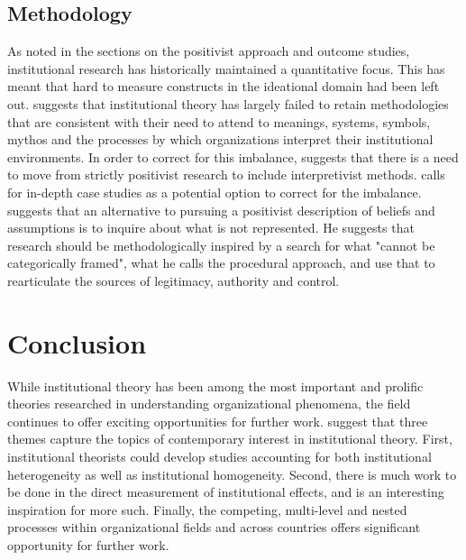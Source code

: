 \documentclass[12pt]{article}
\begin{document}
\subsection{Methodology}
As noted in the sections on the positivist approach and outcome studies, institutional research has historically maintained a quantitative focus. This has meant that hard to measure constructs in the ideational domain had been left out. \cite{Suddaby2010} suggests that institutional theory has largely failed to retain methodologies that are consistent with their need to attend to meanings, systems, symbols, mythos and the processes by which organizations interpret their institutional environments. In order to correct for this imbalance, \cite{Suddaby2010} suggests that  there is a need to move from strictly positivist research to include interpretivist methods. \cite{Suddaby2010} calls for in-depth case studies as a potential option to correct for the imbalance. \cite{Quattrone2015} suggests that an alternative to pursuing a positivist description of beliefs and assumptions is to inquire about what is not represented. He suggests that research should be methodologically inspired by a search for what "cannot be categorically framed", what he calls the procedural approach, and use that to rearticulate the sources of legitimacy, authority and control.

\section{Conclusion}
While institutional theory has been among the most important and prolific theories researched in understanding organizational phenomena, the field continues to offer exciting opportunities for further work. \cite{Powell2007} suggest that three themes capture the topics of contemporary interest in institutional theory. First, institutional theorists could develop studies  accounting for both institutional heterogeneity as well as institutional homogeneity. Second, there is much work to be done in the direct measurement of institutional effects, and \cite{Quattrone2015} is an interesting inspiration for more such. Finally, the competing, multi-level and nested processes within organizational fields and across countries offers significant opportunity for further work.


 

\end{document}
